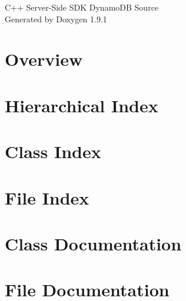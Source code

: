 \let\mypdfximage\pdfximage\def\pdfximage{\immediate\mypdfximage}\documentclass[twoside]{book}
\newcommand{\+}{\discretionary{\mbox{\scriptsize$\hookleftarrow$}}{}{}}
\newcommand{\clearemptydoublepage}{%
  \newpage{\pagestyle{empty}\cleardoublepage}%
}
\begin{document}
\raggedbottom

\hypersetup{pageanchor=false,
             bookmarksnumbered=true,
             pdfencoding=unicode
            }
\begin{titlepage}
\vspace*{7cm}
\begin{center}%
{\Large C++ Server-\/\+Side SDK Dynamo\+DB Source }\\
\vspace*{1cm}
{\large Generated by Doxygen 1.9.1}\\
\end{center}
\end{titlepage}
\clearemptydoublepage
{}
\tableofcontents
\clearemptydoublepage
{}
\hypersetup{pageanchor=true}

\chapter{Overview}
\label{index}\hypertarget{index}{}
\chapter{Hierarchical Index}

\chapter{Class Index}

\chapter{File Index}

\chapter{Class Documentation}






\chapter{File Documentation}







\backmatter
\newpage
{}
\clearemptydoublepage
{}
\printindex
\end{document}
